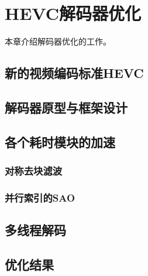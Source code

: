 \chapter{HEVC解码器优化}
本章介绍解码器优化的工作。

\section{新的视频编码标准HEVC}

\section{解码器原型与框架设计}

\section{各个耗时模块的加速}

\subsection{对称去块滤波}

\subsection{并行索引的SAO}

\section{多线程解码}

\section{优化结果}